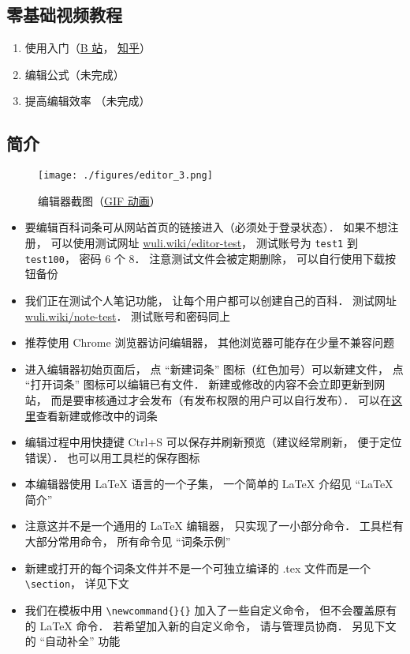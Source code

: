 
\subsection{零基础视频教程}
\begin{enumerate}
\item 使用入门（\href{https://www.bilibili.com/video/av87698355/}{B 站}， \href{https://zhuanlan.zhihu.com/p/105869878}{知乎}）
\item 编辑公式（未完成）
\item 提高编辑效率 （未完成）
\end{enumerate}

\subsection{简介}
\begin{figure}[ht]
\centering
\texttt{[image: ./figures/editor\_3.png]}
\caption{编辑器截图（\href{http://wuli.wiki/apps/editor.gif}{GIF 动画}）} \label{editor_fig3}
\end{figure}

\begin{itemize}
\item 要编辑百科词条可从网站首页的链接进入（必须处于登录状态）． 如果不想注册， 可以使用测试网址 \href{http://wuli.wiki/editor-test}{wuli.wiki/editor-test}， 测试账号为 \verb|test1| 到 \verb|test100|， 密码 6 个 8． 注意测试文件会被定期删除， 可以自行使用下载按钮备份
\item 我们正在测试个人笔记功能， 让每个用户都可以创建自己的百科． 测试网址 \href{http://wuli.wiki/note-test}{wuli.wiki/note-test}． 测试账号和密码同上
\item 推荐使用 Chrome 浏览器访问编辑器， 其他浏览器可能存在少量不兼容问题
\item 进入编辑器初始页面后， 点 “新建词条” 图标（红色加号）可以新建文件， 点 “打开词条” 图标可以编辑已有文件． 新建或修改的内容不会立即更新到网站， 而是要审核通过才会发布（有发布权限的用户可以自行发布）． 可以在\href{http://wuli.wiki/changed/changed.html}{这里}查看新建或修改中的词条
\item 编辑过程中用快捷键 Ctrl+S 可以保存并刷新预览（建议经常刷新， 便于定位错误）． 也可以用工具栏的保存图标
\item 本编辑器使用 LaTeX 语言的一个子集， 一个简单的 LaTeX 介绍见 “LaTeX 简介”
\item 注意这并不是一个通用的 LaTeX 编辑器， 只实现了一小部分命令． 工具栏有大部分常用命令， 所有命令见 “词条示例”
\item 新建或打开的每个词条文件并不是一个可独立编译的 .tex 文件而是一个 \verb|\section|， 详见下文
\item 我们在模板中用 \verb|\newcommand{}{}| 加入了一些自定义命令， 但不会覆盖原有的 LaTeX 命令． 若希望加入新的自定义命令， 请与管理员协商． 另见下文的 “自动补全” 功能
\end{itemize}


